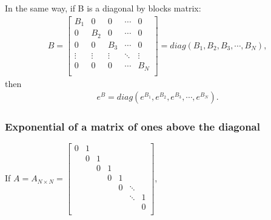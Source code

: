 \documentclass[letterpaper,10pt,english]{jupyterBook}
\begin{document}
\sphinxAtStartPar
In the same way, if B is a diagonal by blocks matrix:
\begin{equation*}
\begin{split}
B =   
\left[ {\begin{array}{ccccc}
    B_1 & 0 & 0 & \dotsm & 0\\
    0 & B_2 & 0 & \dotsm & 0\\
    0 & 0 & B_3 & \dotsm & 0\\
    \vdots & \vdots & \vdots & \ddots & \vdots\\
    0 & 0 & 0 & \dotsm & B_{N}\\
\end{array} } \right] 
  = diag(B_1, B_2, B_3, \dotsm, B_N),
\end{split}
\end{equation*}
\sphinxAtStartPar
then
\begin{equation*}
\begin{split}
e^B = diag(e^{B_1}, e^{B_2}, e^{B_3}, \dotsm, e^{B_N}).
\end{split}
\end{equation*}

\subsubsection{Exponential of a matrix of ones above the diagonal}
\label{\detokenize{cap3:exponential-of-a-matrix-of-ones-above-the-diagonal}}
\sphinxAtStartPar
If \(A = A_{N \times N} =   
\left[ {\begin{array}{ccccccc}
    0 & 1 &  &  &  &  & \\
     & 0 & 1 &  &  &  &\\
     &  & 0 & 1 &  &  &\\
     &  &  & 0 & 1 &  &\\
     &  &  &  & 0 & \ddots &  \\
     &  &  &  &  & \ddots & 1 \\
     &  &  &  &  &  & 0 \\
\end{array} } \right] \),
\end{document}
